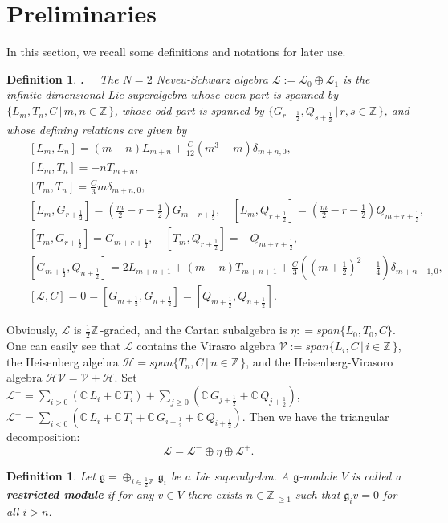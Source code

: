 \documentclass[12pt]{article}
\def\d{\delta}
\def\ssc{\scriptscriptstyle}
\def\Z{\mathbb{Z}{\ssc\,}}
\def\C{\mathbb{C}{\ssc\,}}
\numberwithin{equation}{section}
\newtheorem{defi}[theo]{Definition}
\def\adddot{$\!\!\!${\bf.}\ \ }
\begin{document}
\section{Preliminaries}
In this section, we recall some definitions and notations for later use.
\begin{defi}\adddot
 The $N=2$ Neveu-Schwarz algebra $\mathcal{L}:=\mathcal{L}_{\bar 0}\oplus \mathcal{L}_{\bar 1}$ is the infinite-dimensional Lie superalgebra
 whose even part is spanned by $\{L_m,T_n, C\,|\,m,n\in\Z\}$,  whose odd part is spanned by
 $\{G_{r+\frac{1}{2}}, Q_{s+\frac{1}{2}}\,|\,r,s\in\Z\}$, and  whose defining relations  are given by
\begin{eqnarray*}\label{NS}
&&[L_m,L_n]=(m-n)L_{m+n}+\frac{C}{12}(m^3-m)\d_{m+n,0},\\
&&[L_m,T_n]=-nT_{m+n},\\
&&[T_m,T_n]=\frac{C}{3}m\d_{m+n,0},\\
&&[L_m,G_{r+\frac{1}{2}}]=(\frac{m}{2}-r-\frac{1}{2})G_{m+r+\frac{1}{2}},\quad [L_m,Q_{r+\frac{1}{2}}]=(\frac{m}{2}-r-\frac{1}{2})Q_{m+r+\frac{1}{2}},\\
&&[T_m,G_{r+\frac{1}{2}}]=G_{m+r+\frac{1}{2}},\quad [T_m,Q_{r+\frac{1}{2}}]=-Q_{m+r+\frac{1}{2}},\\
&&[G_{m+\frac{1}{2}},Q_{n+\frac{1}{2}}]=2L_{m+n+1}+(m-n)T_{m+n+1}+\frac{C}{3}\left((m+\frac{1}{2})^2-\frac{1}{4}\right)\d_{m+n+1,0},\\
&&[\mathcal{L},C]=0=[G_{m+\frac{1}{2}},G_{n+\frac{1}{2}}]=[Q_{m+\frac{1}{2}},Q_{n+\frac{1}{2}}].
\end{eqnarray*}
\end{defi}

Obviously, $\mathcal{L}$ is $\frac{1}{2}\Z$-graded, and the Cartan subalgebra  is $\eta: = {span}\{L_0, T_0, C\}$. One can easily
 see that $\mathcal{L}$ contains the Virasro algebra $\mathcal{V}:={span}\{L_i, C \,|\,i\in \Z\}$,
 the Heisenberg algebra $\mathcal{H}={span}\{T_n,C\,|\,n\in \Z\}$, and the Heisenberg-Virasoro algebra $\mathcal{HV}=\mathcal{V}+\mathcal{H}.$
Set $\mathcal{L}^{+}=\sum\limits_{i>0}(\C L_i+\C T_i)+\sum\limits_{j\ge 0}(\C G_{j+\frac{1}{2}}+\C Q_{j+\frac{1}{2}})$, $\mathcal{L}^{-}=\sum\limits_{i<0}(\C L_i+\C T_i+\C G_{i+\frac{1}{2}}+\C Q_{i+\frac{1}{2}})$. Then we have the triangular decomposition:
$$\mathcal{L}=\mathcal{L}^- \oplus \eta \oplus \mathcal{L}^+.$$

 \begin{defi} Let $\mathfrak{g}=\oplus_{i\in \frac{1}{2}\Z}\mathfrak{g}_i$ be a Lie superalgebra. A $\mathfrak{g}$-module $V$ is called a
 {\bf restricted module} if  for any $v\in V$ there exists $n\in\Z_{\ge 1}$ such that $\mathfrak{g}_iv=0$ for all  $i>n$.
 \end{defi}
\end{document}
